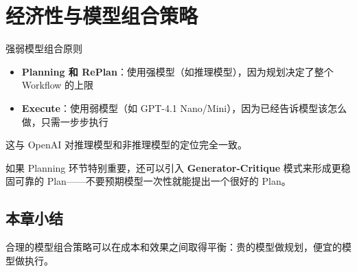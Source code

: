 \section{经济性与模型组合策略}

\begin{importantbox}{强弱模型组合原则}
\begin{itemize}
    \item \textbf{Planning 和 RePlan}：使用强模型（如推理模型），因为规划决定了整个 Workflow 的上限
    \item \textbf{Execute}：使用弱模型（如 GPT-4.1 Nano/Mini），因为已经告诉模型该怎么做，只需一步步执行
\end{itemize}
这与 OpenAI 对推理模型和非推理模型的定位完全一致。
\end{importantbox}

如果 Planning 环节特别重要，还可以引入 \textbf{Generator-Critique} 模式来形成更稳固可靠的 Plan——不要预期模型一次性就能提出一个很好的 Plan。

\subsection{本章小结}

合理的模型组合策略可以在成本和效果之间取得平衡：贵的模型做规划，便宜的模型做执行。

